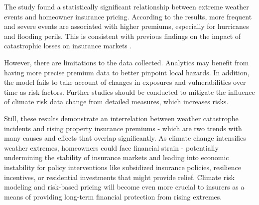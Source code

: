 \documentclass[12pt]{article}
\begin{document}
The study found a statistically significant relationship between extreme weather events and homeowner insurance pricing. According to the 
results, more frequent and severe events are associated with higher premiums, especially for hurricanes and flooding perils. This is 
consistent with previous findings on the impact of catastrophic losses on insurance markets \cite{aon}.

However, there are limitations to the data collected. Analytics may benefit from having more precise premium data to 
better pinpoint local hazards. In addition, the model fails to take account of changes in exposures and vulnerabilities over time as risk 
factors. Further studies should be conducted to mitigate the influence of climate risk data change from detailed measures, which 
increases risks.

Still, these results demonstrate an interrelation between weather catastrophe incidents and rising property insurance premiums - which are 
two trends with many causes and effects that overlap significantly. As climate change intensifies weather extremes, homeowners could 
face financial strain - potentially undermining the stability of insurance markets and leading into economic instability for policy 
interventions like subsidized insurance policies\cite{iii}, resilience incentives, or residential investments\cite{kousky} that 
might provide relief. Climate risk modeling and risk-based pricing will become even more crucial to insurers as a means of providing 
long-term financial protection from rising extremes.






\end{document}
